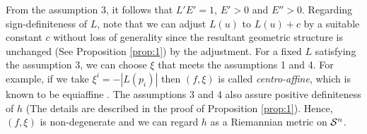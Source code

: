 \documentclass{llncs}
\begin{document}
\begin{remark}
From the assumption 3, it follows that 
$ L' E' =1$, $E'>0$ and $E''>0$.
Regarding sign-definiteness of $L$, note that 
we can adjust $L(u)$ to $L(u)+c$ by 
a suitable constant $c$ without loss of generality 
since the resultant geometric structure is unchanged 
(See Proposition \ref{prop:1}) by the adjustment.
For a fixed $L$ satisfying the assumption 3, 
we can choose $\xi$ that meets the assumptions 1 and 4.
For example, if we take $\xi^i=-|L(p_i)|$ then 
$(f,\xi)$ is called {\em centro-affine}, 
which is known to be equiaffine \cite{NS}.
The assumptions 3 and 4 also assure positive definiteness of $h$
(The details are described in the proof of Proposition \ref{prop:1}).
Hence, $(f,\xi)$ is non-degenerate and  
we can regard $h$ as a Riemannian metric on ${\cal S}^n$.
\end{remark}
\end{document}
